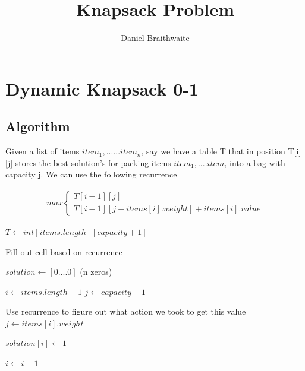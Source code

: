 \documentclass{article}
\title{Knapsack Problem}
\author{Daniel Braithwaite}
\begin{document}
	\maketitle
	\newpage
  	
	\section{Dynamic Knapsack 0-1}  
		\subsection{Algorithm}
		
		 	Given a list of items $item_1,......item_n$, say we have a table T that in position T[i][j] stores the best solution's for packing items $item_1,....item_i$ into a bag with capacity j. We can use the following recurrence
			
			\begin{align}
				max
				\begin{cases}
					T[i-1][j]\\
					T[i-1][j-items[i].weight] + items[i].value
				\end{cases}
			\end{align}				
		
			\begin{algorithm}
				\begin{algorithmic}[1]
						\State $T \gets int[items.length][capacity+1]$
						
								\State Fill out cell based on recurrence
							\EndFor
						\EndFor
						
						\State $solution \gets [0....0]$ (n zeros)						
						
						\State $i \gets items.length-1$
						\State $j \gets capacity-1$
						
						  
							\State Use recurrence to figure out what action we took to get this value
								\State $j \gets items[i].weight$
								
								\State $solution[i] \gets 1$
							\EndIf
							
							\State $i \gets i - 1$
						\EndWhile
						
					\EndProcedure
				\end{algorithmic}
			\end{algorithm}
\end{document}
